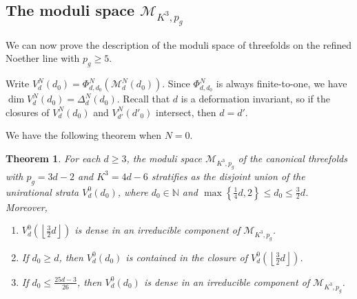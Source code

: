 \documentclass[a4paper,11pt]{amsart}
\newcommand{\M}{\ensuremath{\mathcal{M}}}
\newcommand{\NN}{\ensuremath{\mathbb{N}}}
\newtheorem{thm}{Theorem}[section]
\theoremstyle{definition}
\theoremstyle{remark}
\numberwithin{equation}{section}
\begin{document}
\subsection{The moduli space $\M_{K^3, p_g}$}
We can now prove the description of the moduli space of threefolds on the refined Noether line with $p_g \geq 5$.

Write $V^N_{d}(d_0) = \Phi^N_{d, d_0}(\M^N_{d}(d_0))$. Since $\Phi^N_{d, d_0}$ is always finite-to-one, we have $\dim V^N_{d}(d_0) = \Delta^N_d (d_0)$. Recall that $d$ is a deformation invariant, so if the closures of $V^N_d(d_0)$ and $V^N_{d'}(d'_0)$ intersect, then $d = d'$.

We have the following theorem when $N = 0$.

\begin{thm} \label{thm: moduli N=0}
	For each $d \ge 3$, the moduli space $\M_{K^3, p_g}$ of the canonical threefolds with $p_g = 3d-2$ and $K^3=4d-6$ stratifies as the disjoint union of the unirational strata $V^0_d(d_0)$, where $d_0 \in \NN$ and $\max \left\{ \frac14 d, 2 \right\} \le d_0 \le \frac32 d$. Moreover,
	\begin{enumerate}
		\item $V^0_d\left( \left\lfloor \frac32 d \right\rfloor \right)$ is dense in an irreducible component of $\M_{K^3, p_g}$.
		\item If $d_0 \ge d$, then $V^0_d(d_0)$ is contained in the closure of $V^0_d \left(\left\lfloor \frac32 d \right\rfloor \right)$.
		\item If $d_0 \le \frac{25d-3}{26}$, then $V^0_d(d_0)$ is dense in an irreducible component of $\M_{K^3, p_g}$.
	\end{enumerate}
\end{thm}
\end{document}
